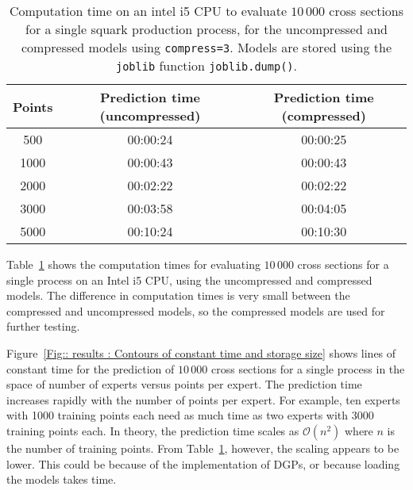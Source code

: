 \documentclass[twoside,english]{uiofysmaster}
\begin{document}
{{\begin{table}
\centering
\begin{tabular}{@{}ccc@{}} \toprule
Points & Prediction time (uncompressed) & Prediction time (compressed)\\ \midrule
500 & 00:00:24 & 00:00:25\\ 
1000 & 00:00:43 & 00:00:43\\
2000 & 00:02:22 & 00:02:22\\
3000 & 00:03:58 & 00:04:05\\
5000 & 00:10:24 & 00:10:30\\ \bottomrule
\end{tabular}
\caption{Computation time on an intel i5 CPU to evaluate $10\,000$ cross sections for a single squark production process, for the uncompressed and compressed models using {\tt compress=3}. Models are stored using the {\tt joblib} function {\tt joblib.dump()}.}
\label{Tab:: results : Computation times, uncompressed and compressed}
\end{table}

Table~\ref{Tab:: results : Computation times, uncompressed and compressed} shows the computation times for evaluating  $10\,000$ cross sections for a single process on an Intel i5 CPU, using the uncompressed and compressed models. The difference in computation times is very small between the compressed and uncompressed models, so the compressed models are used for further testing. 

Figure~\ref{Fig:: results : Contours of constant time and storage size} shows lines of constant time  for the prediction of $10\,000$ cross sections for a single process in the space of number of experts versus points per expert. The prediction time increases rapidly with the number of points per expert. For example, ten experts with 1000 training points each need as much time as two experts with 3000 training points each. In theory, the prediction time scales as $\mathcal{O}(n^2)$ where $n$ is the number of training points. From Table~\ref{Tab:: results : Computation times, uncompressed and compressed}, however, the scaling appears to be lower. This could be because of the implementation of DGPs, or because loading the models takes time.

}}
\end{document}
